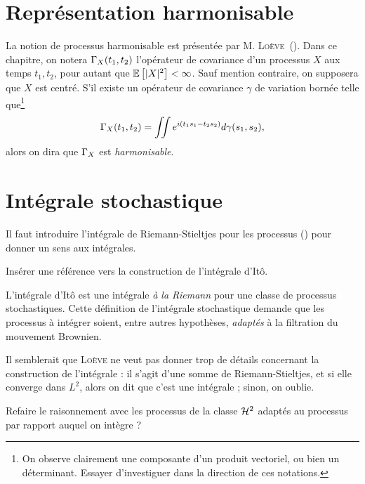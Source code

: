 \section{Représentation harmonisable}
La notion de processus harmonisable est présentée par
M. \textsc{Loève}~(\cite{loeve1978}). Dans ce chapitre, on notera
$\Gamma_X(t_1,t_2)$ l'opérateur de covariance d'un processus $X$ aux
temps $t_1, t_2$, pour autant que $\mathbb{E}\left[|X|^2\right] < \infty$. Sauf mention
contraire, on supposera que $X$ est centré. S'il existe un opérateur
de covariance $\gamma$ de variation bornée telle que\footnote{On
  observe clairement une composante d'un produit vectoriel, ou bien un
  déterminant. Essayer d'investiguer dans la direction de ces
  notations.}
\[ \Gamma_X(t_1,t_2) = \iint e^{i(t_1s_1 - t_2s_2)} d\gamma(s_1,s_2)
  ,\] alors on dira que $\Gamma_X$ est \emph{harmonisable}.

\section{Intégrale stochastique}

\begin{prerequis}
  Il faut introduire l'intégrale de Riemann-Stieltjes pour les
  processus (\cite[p.~138]{loeve1978}) pour donner un sens aux
  intégrales.
\end{prerequis}

\begin{alert}
  Insérer une référence vers la construction de l'intégrale d'Itô.
\end{alert}

L'intégrale d'Itô est une intégrale \emph{\og à la Riemann \fg{}} pour
une classe de processus stochastiques. Cette définition de l'intégrale
stochastique demande que les processus à intégrer soient, entre autres
hypothèses, \emph{adaptés} à la filtration du mouvement Brownien.

\begin{alert}
  Il semblerait que \textsc{Loève} ne veut pas donner trop de détails
  concernant la construction de l'intégrale : il s'agit d'une somme de
  Riemann-Stieltjes, et si elle converge dans $L^2$, alors on dit que
  c'est une intégrale ; sinon, on oublie.
\end{alert}

\begin{question}
  Refaire le raisonnement avec les processus de la classe $\mathcal{H}^2$
  adaptés au processus par rapport auquel on intègre ?
\end{question}

